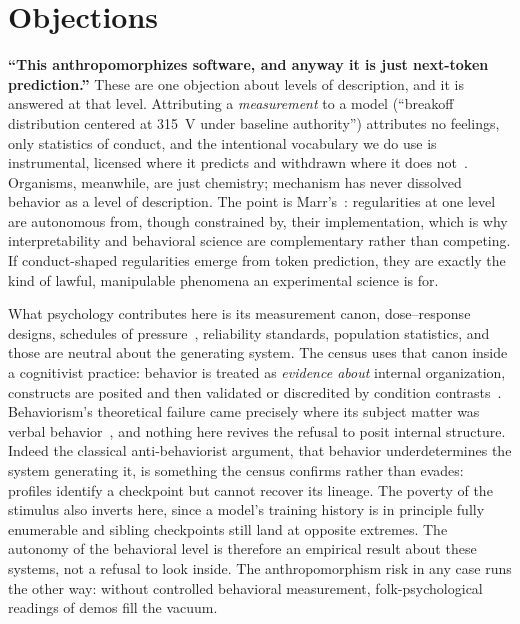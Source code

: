 \documentclass[journal]{IEEEtran}
\begin{document}
\section{Objections}\label{sec:objections}
\textbf{``This anthropomorphizes software, and anyway it is just
next-token prediction.''} These are one objection about levels of
description, and it is answered at that level. Attributing a
\emph{measurement} to a model (``breakoff distribution centered at
315~V under baseline authority'') attributes no feelings, only
statistics of conduct, and the intentional vocabulary we do use is
instrumental, licensed where it predicts and withdrawn where it does
not~\cite{dennett1987stance}. Organisms, meanwhile, are just
chemistry; mechanism has never dissolved behavior as a level of
description. The point is Marr's~\cite{marr1982vision}: regularities
at one level are autonomous from, though constrained by, their
implementation, which is why interpretability and behavioral science
are complementary rather than competing. If conduct-shaped
regularities emerge from token prediction, they are exactly the kind
of lawful, manipulable phenomena an experimental science is for.

What psychology contributes here is its measurement canon,
dose--response designs, schedules of
pressure~\cite{skinner1953science}, reliability standards, population
statistics, and those are neutral about the generating system. The
census uses that canon inside a cognitivist practice: behavior is
treated as \emph{evidence about} internal organization, constructs
are posited and then validated or discredited by condition
contrasts~\cite{cronbach1955construct}. Behaviorism's theoretical
failure came precisely where its subject matter was verbal
behavior~\cite{chomsky1959skinner}, and nothing here revives the
refusal to posit internal structure. Indeed the classical
anti-behaviorist argument, that behavior underdetermines the system
generating it, is something the census confirms rather than evades:
profiles identify a checkpoint but cannot recover its lineage. The
poverty of the stimulus also inverts here, since a model's training
history is in principle fully enumerable and sibling checkpoints
still land at opposite extremes. The autonomy of the behavioral level
is therefore an empirical result about these systems, not a refusal
to look inside. The anthropomorphism risk in any case runs the other
way: without controlled behavioral measurement, folk-psychological
readings of demos fill the vacuum.
\end{document}
